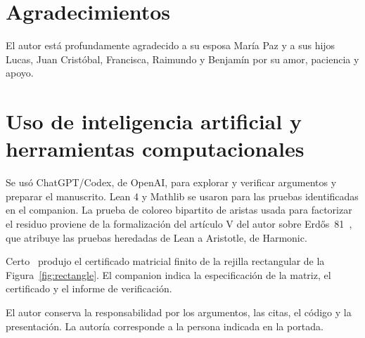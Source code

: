\documentclass[11pt]{article}
\begin{document}
\section*{Agradecimientos}

El autor está profundamente agradecido a su esposa María Paz y a sus hijos Lucas, Juan Cristóbal, Francisca, Raimundo y Benjamín por su amor, paciencia y apoyo.

\section*{Uso de inteligencia artificial y herramientas computacionales}

Se usó ChatGPT/Codex, de OpenAI, para explorar y verificar argumentos y preparar el manuscrito. Lean 4 y Mathlib se usaron para las pruebas identificadas en el companion. La prueba de coloreo bipartito de aristas usada para factorizar el residuo proviene de la formalización del artículo V del autor sobre Erdős~81~\cite{TraversoV}, que atribuye las pruebas heredadas de Lean a Aristotle, de Harmonic.

Certo~\cite{Certo} produjo el certificado matricial finito de la rejilla rectangular de la Figura~\ref{fig:rectangle}. El companion indica la especificación de la matriz, el certificado y el informe de verificación.

El autor conserva la responsabilidad por los argumentos, las citas, el código y la presentación. La autoría corresponde a la persona indicada en la portada.
\end{document}
